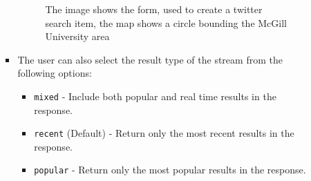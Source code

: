 \begin{itemize}
\begin{itemize}
\begin{itemize}
\begin{figure}
\begin{center}
\caption{The image shows the form, used to create a twitter search item, the map shows a circle bounding the McGill University area}
\label{fig:createtwitter}
\end{center}
\end{figure}	
		\item The user can also select the result type of the stream from the following options: 
		\begin{itemize}
		\item \texttt{mixed} - Include both popular and real time results in the response.
		\item \texttt{recent} (Default) - Return only the most recent results in the response.
		\item \texttt{popular} - Return only the most popular results in the response.
		

\end{itemize}
\end{itemize}
\end{itemize}
\end{itemize}
